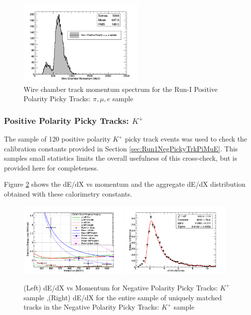 \begin{figure}[htb]
\centering
\includegraphics[width=0.55\textwidth]{images/WCTrkMomentumRun1PosPiMuE.png}
\caption{Wire chamber track momentum spectrum for the Run-I Positive Polarity Picky Tracks: $\pi, \mu, e$ sample}
\label{fig:Run1PosPickyTrkPiMuEMomentumSpec}
\end{figure}

\subsubsection{Positive Polarity Picky Tracks: $K^{+}$}\label{sec:Run1PosPickyTrkKaons}
The sample of 120 positive polarity $K^{+}$ picky track events was used to check the calibration constants provided in Section \ref{sec:Run1NegPickyTrkPiMuE}. This samples small statistics limits the overall usefulness of this cross-check, but is provided here for completeness.

Figure \ref{fig:Run1PosPickyTrkKaonResults} shows the dE/dX vs momentum and the aggregate dE/dX distribution obtained with these calorimetry constants.

\begin{figure}[htb]
\centering
\includegraphics[width=0.48\textwidth]{images/dEdXvsMomentumPosPolRun1Kaon.png}
\includegraphics[width=0.48\textwidth]{images/dEdXKaonRunIPosPol.png}
\caption{(Left) dE/dX vs Momentum for Negative Polarity Picky Tracks: $K^{+}$ sample ,(Right) dE/dX for the entire sample of uniquely matched tracks in the Negative Polarity Picky Tracks: $K^{+}$ sample }
\label{fig:Run1PosPickyTrkKaonResults}
\end{figure}


